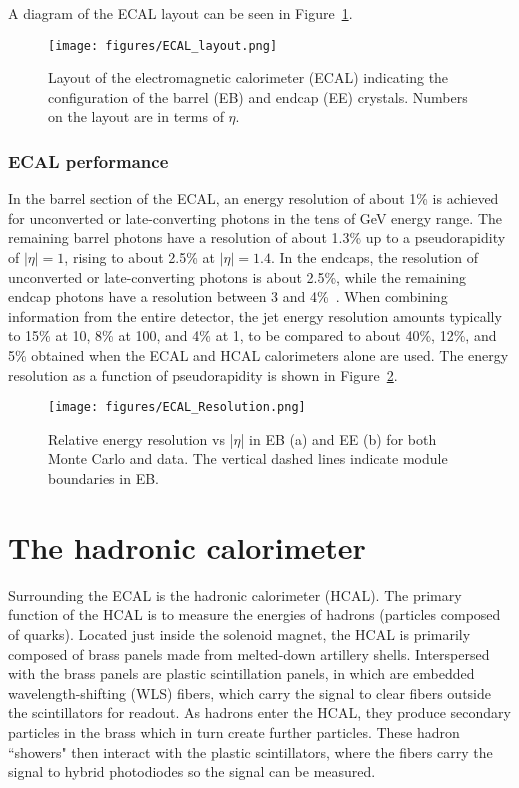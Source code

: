 A diagram of the ECAL layout can be seen in Figure~\ref{fig:ECAL_layout}.

\begin{figure}\centering
  \texttt{[image: figures/ECAL\_layout.png]}
  \caption{\label{fig:ECAL_layout} Layout of the electromagnetic calorimeter (ECAL) indicating the configuration of the barrel (EB) and endcap (EE) crystals. Numbers on the layout are in terms of $\eta$.}
\end{figure}

\subsubsection{ECAL performance}

In the barrel section of the ECAL, an energy resolution of about 1\% is achieved for unconverted or late-converting photons in the tens of GeV energy range. The remaining barrel photons have a resolution of about 1.3\% up to a pseudorapidity of $|\eta| = 1$, rising to about 2.5\% at $|\eta| = 1.4$. In the endcaps, the resolution of unconverted or late-converting photons is about 2.5\%, while the remaining endcap photons have a resolution between 3 and 4\%~\cite{CMS:EGM-14-001}. When combining information from the entire detector, the jet energy resolution amounts typically to 15\% at 10\GeV, 8\% at 100\GeV, and 4\% at 1\TeV, to be compared to about 40\%, 12\%, and 5\% obtained when the ECAL and HCAL calorimeters alone are used. The energy resolution as a function of pseudorapidity is shown in Figure~\ref{fig:ECAL_Resolution}. \cite{ECAL}

\begin{figure}\centering
  \texttt{[image: figures/ECAL\_Resolution.png]}
  \caption{\label{fig:ECAL_Resolution} Relative energy resolution vs |$\eta$| in EB (a) and EE (b) for both Monte Carlo and data. The vertical dashed lines indicate module boundaries in EB.}
\end{figure}





\section{The hadronic calorimeter}

Surrounding the ECAL is the hadronic calorimeter (HCAL). The primary function of the HCAL is to measure the energies of hadrons (particles composed of quarks). Located just inside the solenoid magnet, the HCAL is primarily composed of brass panels made from melted-down artillery shells. Interspersed with the brass panels are plastic scintillation panels, in which are embedded wavelength-shifting (WLS) fibers, which carry the signal to clear fibers outside the scintillators for readout. As hadrons enter the HCAL, they produce secondary particles in the brass which in turn create further particles. These hadron ``showers" then interact with the plastic scintillators, where the fibers carry the signal to hybrid photodiodes so the signal can be measured.


